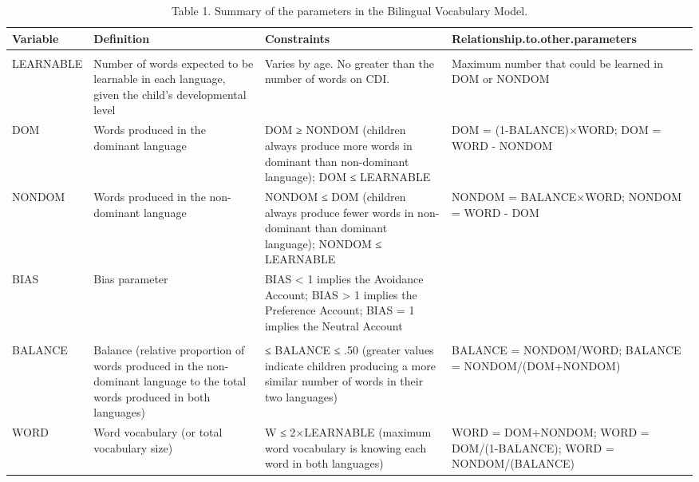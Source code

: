 \documentclass[
  english,
  ,man,floatsintext]{apa6}
\begin{document}
\begin{landscape}\begin{table}

\caption{\label{tab:table1}Table 1. Summary of the parameters in the Bilingual Vocabulary Model.}
\centering
\fontsize{7}{9}\selectfont
\begin{threeparttable}
\begin{tabular}[t]{l>{\raggedright\arraybackslash}p{175px}>{\raggedright\arraybackslash}p{175px}>{\raggedright\arraybackslash}p{175px}}
\toprule
Variable & Definition & Constraints & Relationship.to.other.parameters\\
\midrule
\addlinespace[0.3em]
\multicolumn{4}{l}{\textbf{Main Parameters}}\\
\hspace{1em}LEARNABLE & Number of words expected to be learnable in each language, given the child’s developmental level & Varies by age. No greater than the number of words on CDI. & Maximum number that could be learned in DOM or NONDOM\\
\hspace{1em}DOM & Words produced in the dominant language & DOM ≥ NONDOM (children always produce more words in dominant than non-dominant language); DOM ≤ LEARNABLE & DOM = (1-BALANCE)×WORD; DOM = WORD - NONDOM\\
\hspace{1em}NONDOM & Words produced in the non-dominant language & NONDOM ≤ DOM (children always produce fewer words in non-dominant than dominant language); NONDOM ≤ LEARNABLE & NONDOM = BALANCE×WORD; NONDOM = WORD - DOM\\
\hspace{1em}BIAS & Bias parameter & BIAS < 1 implies the Avoidance Account; BIAS > 1 implies the Preference Account; BIAS = 1 implies the Neutral Account & \\
\addlinespace[0.3em]
\multicolumn{4}{l}{\textbf{Derived Parameters}}\\
\hspace{1em}BALANCE & Balance (relative proportion of words produced in the non-dominant language to the total words produced in both languages) & 0 ≤ BALANCE ≤ .50 (greater values indicate children producing a more similar number of words in their two languages) & BALANCE = NONDOM/WORD; BALANCE = NONDOM/(DOM+NONDOM)\\
\hspace{1em}WORD & Word vocabulary (or total vocabulary size) & W ≤ 2×LEARNABLE (maximum word vocabulary is knowing each word in both languages) & WORD = DOM+NONDOM; WORD = DOM/(1-BALANCE); WORD = NONDOM/(BALANCE)\\

\end{tabular}
\end{threeparttable}
\end{table}
\end{landscape}
\end{document}
